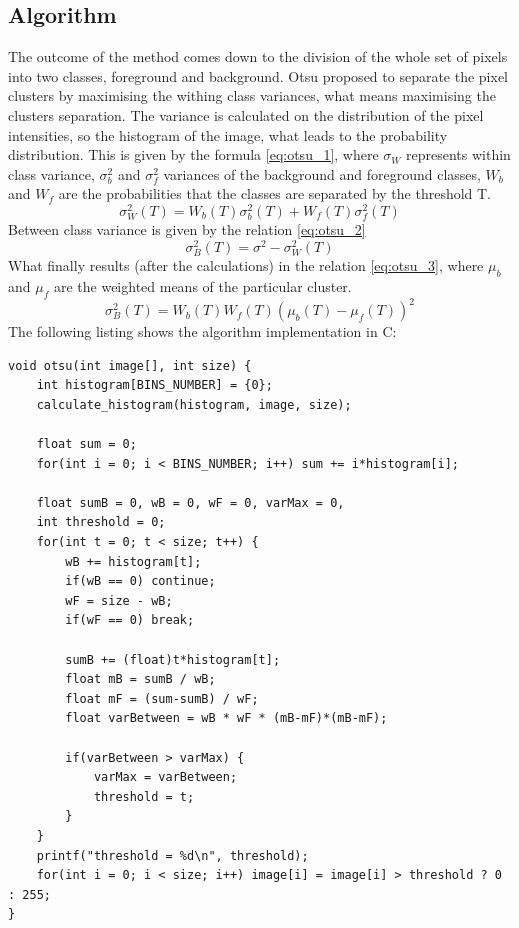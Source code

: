 \subsection{Algorithm}
The outcome of the method comes down to the division of the whole set of pixels into two classes, foreground and background. Otsu proposed to separate the pixel clusters by maximising the withing class variances, what means maximising the clusters separation. The variance is calculated on the distribution of the pixel intensities, so the histogram of the image, what leads to the probability distribution. This is given by the formula \ref{eq:otsu_1}, where $\sigma_W$ represents within class variance, $\sigma_{b}^{2}$ and $\sigma_{f}^{2}$ variances of the background and foreground classes, $W_b$ and $W_f$ are the probabilities that the classes are separated by the threshold T.
\begin{equation} \label{eq:otsu_1}
\sigma_{W}^{2}(T) = W_b(T)\sigma_{b}^{2}(T) + W_f(T)\sigma_{f}^{2}(T)
\end{equation}
Between class variance is given by the relation \ref{eq:otsu_2}
\begin{equation} \label{eq:otsu_2}
    \sigma_{B}^{2}(T) = \sigma^{2} - \sigma_{W}^{2}(T)
\end{equation}
What finally results (after the calculations) in the relation \ref{eq:otsu_3}, where $\mu_b$ and $\mu_f$ are the weighted means of the particular cluster.
\begin{equation} \label{eq:otsu_3}
    \sigma_{B}^{2}(T) = W_b(T)W_f(T)(\mu_{b}(T) - \mu_{f}(T))^2
\end{equation}
The following listing shows the algorithm implementation in C:
\begin{verbatim}
void otsu(int image[], int size) {
    int histogram[BINS_NUMBER] = {0};
    calculate_histogram(histogram, image, size);
    
    float sum = 0;
    for(int i = 0; i < BINS_NUMBER; i++) sum += i*histogram[i];
    
    float sumB = 0, wB = 0, wF = 0, varMax = 0, 
    int threshold = 0;
    for(int t = 0; t < size; t++) {
        wB += histogram[t];
        if(wB == 0) continue;
        wF = size - wB;
        if(wF == 0) break;
        
        sumB += (float)t*histogram[t];
        float mB = sumB / wB;
        float mF = (sum-sumB) / wF;
        float varBetween = wB * wF * (mB-mF)*(mB-mF);
        
        if(varBetween > varMax) {
            varMax = varBetween;
            threshold = t;
        }
    }
    printf("threshold = %d\n", threshold);
    for(int i = 0; i < size; i++) image[i] = image[i] > threshold ? 0 : 255;
}
\end{verbatim}
